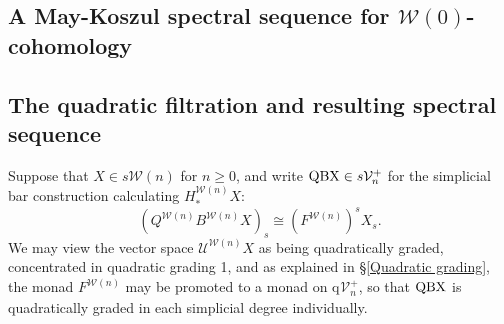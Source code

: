 \documentclass[11pt]{amsart} \renewcommand{\baselinestretch}{1.2}
\theoremstyle{plain}
\numberwithin{equation}{section} %
\theoremstyle{plain}
\numberwithin{equation}{chapter} %
\newcommand{\calW}{\mathcal{W}}
\newcommand{\calU}{\mathcal{U}}
\newcommand{\calV}{\mathcal{V}}
\newcommand{\calw}{\mathcal{W}}
\newcommand{\vect}[2]{\calV^{#1}_{#2}}
\newcommand{\quadgrad}[1]{\mathrm{q}_{#1}}
\newcommand{\SectionOrChapter}[1]{\section{\textbf{#1}}}
\newcommand{\SubsectionOrSection}[1]{\subsection{#1}}
\begin{document}
\begin{May sseq and vanishing line}
\SectionOrChapter{A May-Koszul spectral sequence for ${\calw(0)}$-cohomology}
\label{May sseq and vanishing line}

\SubsectionOrSection{The quadratic filtration and resulting spectral sequence}
\label{The quadratic filtration section}
Suppose that $X\in s\calw(n)$ for  $n\geq0$, and write $\textup{QBX}\in s\vect{+}{n}$ for the simplicial bar construction   calculating $H_*^{\calw(n)}X$:
\[(Q^{\calw(n)}B^{\calw(n)}X)_s\cong (F^{\calw(n)})^{s}X_{s}.\] We may view the vector space $\calU^{\calw(n)}X$ as being quadratically graded, concentrated in quadratic grading 1, and as explained in \S\ref{Quadratic grading}, the monad $F^{\calW(n)}$ may be promoted to a monad on $\quadgrad{}\vect{+}{n}$, so that $\textup{QBX}$ is quadratically graded in each simplicial degree individually.


\end{May sseq and vanishing line}
\end{document}
